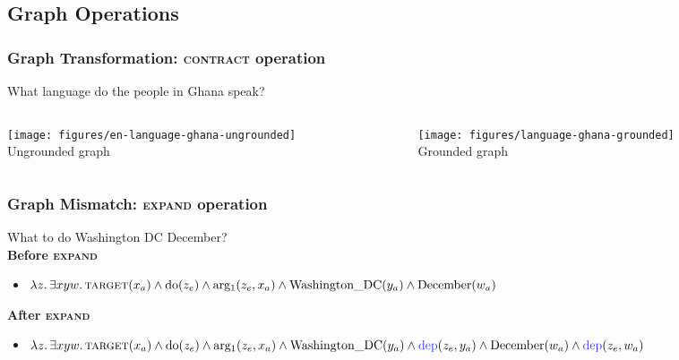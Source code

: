 \documentclass[mathserif,12pt]{beamer}
\newcommand{\hlight}[1]{{\color{blue!80} #1}}
\newcommand \contract{\textsc{contract}\xspace}
\newcommand \expand{\textsc{expand}\xspace}
\renewcommand{\land}{\wedge}
\newcommand{\lspace}{.\,}
\begin{document}
\subsection{Graph Operations}
\begin{frame}[noframenumbering]
\frametitle{Graph Transformation: \contract operation}

\begin{center}
  What language do the people in Ghana speak?
\end{center}

\begin{columns}
  \begin{column}{0.35\textwidth}
   \centering
   \texttt{[image: figures/en-language-ghana-ungrounded]} \\
   \small Ungrounded graph
  \end{column}
  \begin{column}{0.35\textwidth}
    \centering
   \texttt{[image: figures/language-ghana-grounded]} \\
   \small Grounded graph 
  \end{column}
\end{columns}
\end{frame}

\begin{frame}[noframenumbering]
\frametitle{Graph Mismatch: \expand operation}

 What to do Washington DC December? \\
 

 \vspace{0.5cm} 
 \textbf{Before \expand}
 \begin{itemize}
   \item $\lambda z \lspace \exists x y w \lspace \textsc{target}(x_a) \land
\mathrm{do}(z_e) \land \mathrm{arg_1}(z_e, x_a) \land
\mathrm{Washington\_DC}(y_a) \land \mathrm{December}(w_a)$
   \end{itemize}
 
 \vspace{0.5cm}
 \textbf{After \expand}
 \begin{itemize}
   \item $\lambda z\lspace \exists x y w \lspace \textsc{target}(x_a) \land \mathrm{do}(z_e) \land \mathrm{arg_1}(z_e, x_a) \land \mathrm{Washington\_DC}(y_a) \land
   \mathrm{\hlight{dep}}(z_e, y_a) \land \mathrm{December}(w_a) \land \mathrm{\hlight{dep}}(z_e, w_a)$
   \end{itemize}
\end{frame}
\end{document}
